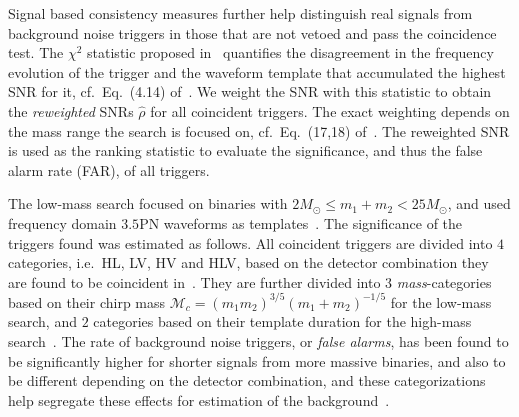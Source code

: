 Signal based 
consistency measures further help distinguish real signals from background noise
triggers in those that are not vetoed and pass the coincidence test. 
The $\chi^{2}$ statistic proposed in~\cite{Allen:2004gu} quantifies the 
disagreement in the frequency evolution of 
the trigger and the waveform template that accumulated the highest SNR
for it, cf.\ Eq.~(4.14) of~\cite{Allen:2004gu}. We weight the SNR with this
statistic to obtain the \textit{reweighted} SNRs $\hat{\rho}$ 
for all coincident triggers. 
The exact weighting depends on the mass range the search is focused on, cf.\
Eq.~(17,18) of~\cite{Babak:2012zx}. The reweighted SNR is used as the
ranking statistic to evaluate the significance, and thus the false alarm rate 
(FAR), of all triggers. 

The low-mass search focused on binaries with $2M_\odot
\leq m_{1}+m_{2} < 25M_\odot$, and used frequency domain $3.5$PN 
waveforms as templates~\cite{Blanchet:2001ax, Blanchet:2001aw, Blanchet:2004ek}.
The significance of the triggers found was estimated as follows.
All coincident triggers are divided into $4$ 
categories, i.e.\ HL, LV, HV and HLV, based on the detector combination they are 
found to be coincident in~\cite{Colaboration:2011np}. They are further divided 
into
$3$ \textit{mass}-categories based on their chirp mass
$\mathcal{M}_{c}=(m_{1}m_{2})^{3/5}(m_{1}+m_{2})^{-1/5}$ for the low-mass 
search, and $2$ categories based on their template duration for the high-mass 
search~\cite{Colaboration:2011np}. The rate of background noise triggers, or 
\textit{false alarms}, has been found to be significantly higher for shorter 
signals from more massive binaries, and also to be different depending on the 
detector combination, and these categorizations help segregate these effects 
for estimation of the background~\cite{Colaboration:2011np,Babak:2012zx}. 

